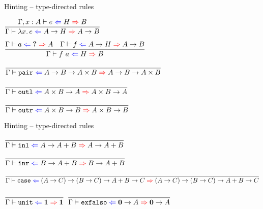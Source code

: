 \documentclass{beamer}
\begin{document}
\begin{frame}{Hinting -- type-directed rules}

\begin{center}
  $\infrule{\fullhinting{\extend{\Gamma}{x}{A}}{e}{H}{B}}{\hinting{\fun{x}{e}}{\Fun{A}{H}}{\Fun{A}{B}}}$

  \vspace{2em}

  $\infrule{\hinting{a}{\Hole}{A} \quad \hinting{f}{\Fun{A}{H}}{\Fun{A}{B}}}{\hinting{\app{f}{a}}{H}{B}}$

  \vspace{2em}

  $\infrule{}{\hinting{\funpair}{\Fun{A}{\Fun{B}{\Prod{A}{B}}}}{\Fun{A}{\Fun{B}{\Prod{A}{B}}}}}$

  \vspace{2em}

  $\infrule{}{\hinting{\funoutl}{\Fun{\Prod{A}{B}}{A}}{\Fun{\Prod{A}{B}}{A}}}$

  \vspace{2em}

  $\infrule{}{\hinting{\funoutr}{\Fun{\Prod{A}{B}}{B}}{\Fun{\Prod{A}{B}}{B}}}$
\end{center}

\end{frame}

\begin{frame}{Hinting -- type-directed rules}

\begin{center}
  $\infrule{}{\hinting{\funinl}{\Fun{A}{\Sum{A}{B}}}{\Fun{A}{\Sum{A}{B}}}}$

  \vspace{2em}

  $\infrule{}{\hinting{\funinr}{\Fun{B}{\Sum{A}{B}}}{\Fun{B}{\Sum{A}{B}}}}$

  \vspace{2em}

  $\infrule{}{\hinting{\funcase}{\Fun{(\Fun{A}{C})}{\Fun{(\Fun{B}{C})}{\Fun{\Sum{A}{B}}{C}}}}{{\Fun{(\Fun{A}{C})}{\Fun{(\Fun{B}{C})}{\Fun{\Sum{A}{B}}{C}}}}}}$

  \vspace{2em}

  $\infrule{}{\hinting{\unit}{\Unit}{\Unit}}$ \quad
  $\infrule{}{\hinting{\funexfalso}{\Fun{\Empty}{A}}{\Fun{\Empty}{A}}}$
\end{center}

\end{frame}
\end{document}
